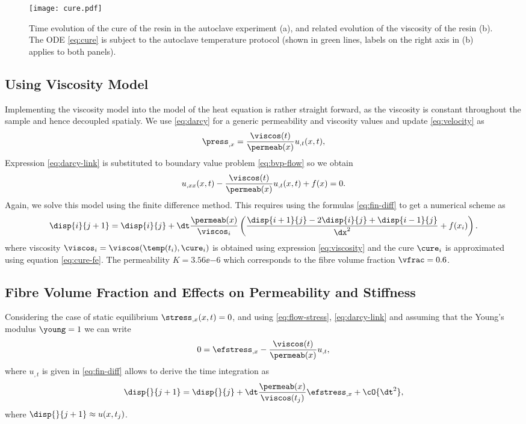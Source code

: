 \documentclass[twoside,a4paper,12pt,draft]{article}
\begin{document}
\begin{figure}
  \centering
  \texttt{[image: cure.pdf]}
  \caption{Time evolution of the cure of the resin in the autoclave
    experiment (a), and related evolution of the viscosity of the
    resin (b). The ODE \eqref{eq:cure} is subject to the autoclave
    temperature protocol (shown in green lines, labels on the right
    axis in (b) applies to both panels).}
  \label{fig:cure-exp}
\end{figure}


\subsection{Using Viscosity Model}


Implementing the viscosity model into the model of the heat equation
is rather straight forward, as the viscosity is constant throughout
the sample and hence decoupled spatialy. 
%
We use \eqref{eq:darcy} for a generic permeability and viscosity
values and update \eqref{eq:velocity} as
%
\begin{align}
 \press_{,x} =\frac{\viscos(t)}{\permeab(x)}    u_{,t}(x,t) ,  \label{eq:darcy-link}
\end{align}
%
Expression \eqref{eq:darcy-link} is substituted to boundary value problem \eqref{eq:bvp-flow}
so we obtain
%
\begin{align}
   u_{,xx}(x,t) - \frac{\viscos(t)}{\permeab(x)}    u_{,t}(x,t) + f(x) =0.
\end{align}
%
Again, we solve this model using the finite difference method. This
requires using the formulas \eqref{eq:fin-diff} to get a numerical scheme as
%
\begin{align}
  \disp{i}{j+1}  =   \disp{i}{j} + \dt\frac{\permeab(x)}{\viscos_i}\left(\frac{\disp{i+1}{j} - 2\disp{i}{j} + \disp{i-1}{j}}{\dx^2}   + f(x_i) \right). 
\end{align}
%
where viscosity $\viscos_i = \viscos(\temp(t_i),\cure_i)$ is obtained
using expression \eqref{eq:viscosity} and the cure $\cure_i$ is
approximated using equation \eqref{eq:cure-fe}. The permeability
$K=3.56\ee{-6}$ which corresponds to the fibre volume fraction $\vfrac = 0.6$.

\subsection{Fibre Volume Fraction and Effects on Permeability and Stiffness}

Considering the case of static equilibrium $\stress_{,x}(x,t)=0$, and
using \eqref{eq:flow-stress}, \eqref{eq:darcy-link} and assuming that
the Young's modulus $\young = 1$ we can write
%
\begin{align}
  0 = \efstress_{,x} - \frac{\viscos(t)}{\permeab(x)}    u_{,t}, \label{eq:flow-stres_x}
\end{align}
%
where $u_{,t}$ is given in \eqref{eq:fin-diff} allows to derive the
time integration as
\begin{align}
  \disp{}{j+1} = \disp{}{j} + \dt \frac{\permeab(x)}{\viscos(t_j)}\efstress_{,x} + \cO{\dt^2},
\end{align}
%
where $\disp{}{j+1} \approx u(x,t_j)$.
\end{document}
